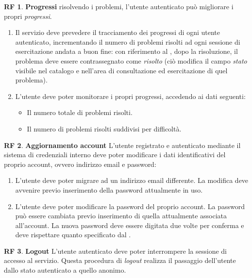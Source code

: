 \documentclass[11pt, a4paper]{article}
\theoremstyle{definition}
\newtheorem{funcreq}{RF} %
\begin{document}
\begin{funcreq}
\label{stats}
\textbf{Progressi } risolvendo i problemi, l'utente autenticato può migliorare
i propri \textit{progressi}.
\begin{enumerate}
    \item Il servizio deve prevedere il tracciamento dei progressi di ogni
    utente autenticato, incrementando il numero di problemi risolti ad ogni
    sessione di esercitazione andata a buon fine: con riferimento al
    \textcolor{blue}{},
    dopo la risoluzione, il problema deve essere contrassegnato come
    \textit{risolto} (ciò modifica il campo \textit{stato} visibile nel catalogo
    e nell'area di consultazione ed esercitazione di quel problema).

    \item L'utente deve poter monitorare i propri progressi, accedendo ai dati
    seguenti:
    \begin{itemize}
        \item Il numero totale di problemi risolti.
        \item Il numero di problemi risolti suddivisi per difficoltà.
    \end{itemize}
\end{enumerate}
\end{funcreq}


\begin{funcreq}
\label{updateaccount}
\textbf{Aggiornamento account }
L'utente registrato e autenticato mediante il sistema di credenziali interno
deve poter modificare i dati identificativi del proprio account, ovvero indirizzo
email e password:
\begin{enumerate}
\item L'utente deve poter migrare ad un indirizzo email differente. La modifica
deve avvenire previo inserimento della password attualmente in uso.

\item L'utente deve poter modificare la password del proprio account.
La password può essere cambiata previo inserimento di quella attualmente
associata all'account. La nuova password deve essere digitata due volte
per conferma e deve rispettare quanto specificato dal
\textcolor{blue}{}.
\end{enumerate}
\end{funcreq}
    
\begin{funcreq}
\label{logout}
\textbf{Logout }
L'utente autenticato deve poter interrompere la sessione di accesso
al servizio. Questa procedura di \textit{logout} realizza il passaggio dell'utente
dallo stato autenticato a quello anonimo.
\end{funcreq}
\end{document}
